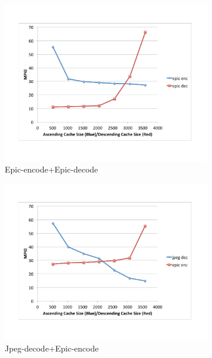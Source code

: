 \documentclass{acm_proc_article-sp}
\begin{document}
\begin{figure}
  \centering
  \begin{subfigure}[b]{0.22\textwidth}
    \includegraphics[width=\textwidth]{figs/epic-encode+epic-decode.pdf}
    \caption{Epic-encode+Epic-decode}
    \label{fig:epic-encode-epic-decode}
  \end{subfigure}
  \begin{subfigure}[b]{0.22\textwidth}
    \includegraphics[width=\textwidth]{figs/jpeg-decode+epic-encode.pdf}
    \caption{Jpeg-decode+Epic-encode}
    \label{fig:jpeg-decode-epic-encode}
  \end{subfigure}
  \begin{subfigure}[b]{0.22\textwidth}

\end{subfigure}
\end{figure}
\end{document}
